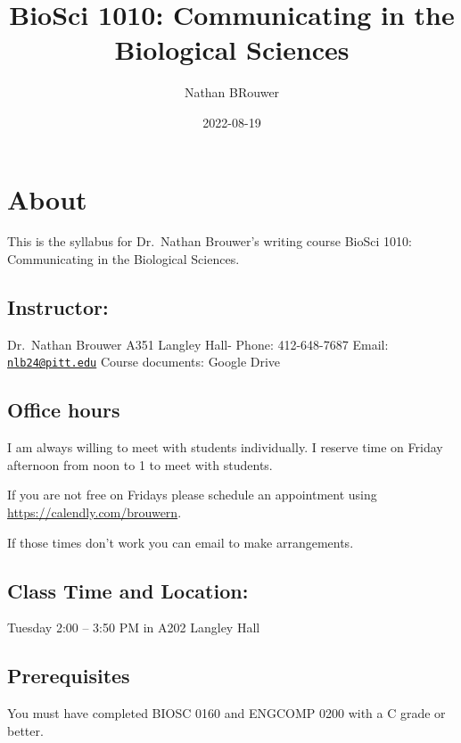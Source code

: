\documentclass[
]{book}
\title{BioSci 1010: Communicating in the Biological Sciences}
\author{Nathan BRouwer}
\date{2022-08-19}
\begin{document}
\maketitle

{
\setcounter{tocdepth}{1}
\tableofcontents
}
\hypertarget{about}{%
\chapter{About}\label{about}}

This is the syllabus for Dr.~Nathan Brouwer's writing course BioSci 1010: Communicating in the Biological Sciences.

\hypertarget{instructor}{%
\section{Instructor:}\label{instructor}}

Dr.~Nathan Brouwer
A351 Langley Hall-
Phone: 412-648-7687
Email: \href{mailto:nlb24@pitt.edu}{\nolinkurl{nlb24@pitt.edu}}
Course documents: Google Drive

\hypertarget{office-hours}{%
\section{Office hours}\label{office-hours}}

I am always willing to meet with students individually. I reserve time on Friday afternoon from noon to 1 to meet with students.

If you are not free on Fridays please schedule an appointment using \url{https://calendly.com/brouwern}.

If those times don't work you can email to make arrangements.

\hypertarget{class-time-and-location}{%
\section{Class Time and Location:}\label{class-time-and-location}}

Tuesday 2:00 -- 3:50 PM in A202 Langley Hall

\hypertarget{prerequisites}{%
\section{Prerequisites}\label{prerequisites}}

You must have completed BIOSC 0160 and ENGCOMP 0200 with a C grade or better.
\end{document}
